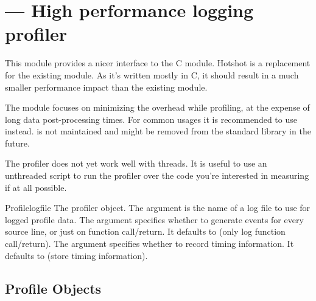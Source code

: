 \section{ ---
         High performance logging profiler}




This module provides a nicer interface to the  C module.
Hotshot is a replacement for the existing  module. As it's
written mostly in C, it should result in a much smaller performance impact
than the existing  module.

\begin{notice}[note]
  The  module focuses on minimizing the overhead
  while profiling, at the expense of long data post-processing times.
  For common usages it is recommended to use  instead.
   is not maintained and might be removed from the
  standard library in the future.
\end{notice}


\begin{notice}[warning]
  The  profiler does not yet work well with threads.
  It is useful to use an unthreaded script to run the profiler over
  the code you're interested in measuring if at all possible.
\end{notice}


\begin{classdesc}{Profile}{logfile}
The profiler object. The argument  is the name of a log
file to use for logged profile data. The argument 
specifies whether to generate events for every source line, or just on
function call/return. It defaults to  (only log function
call/return). The argument  specifies whether to
record timing information. It defaults to  (store timing
information).
\end{classdesc}


\subsection{Profile Objects \label{hotshot-objects}}

